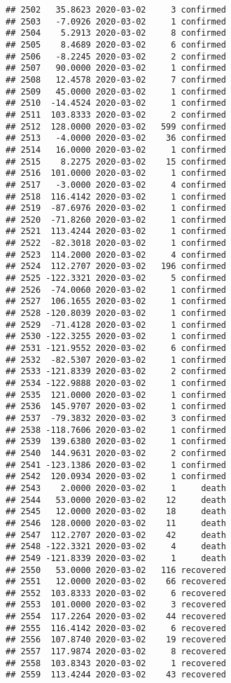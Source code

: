 \documentclass[
]{article}
\begin{document}
\begin{verbatim}
## 2502   35.8623 2020-03-02     3 confirmed
## 2503   -7.0926 2020-03-02     1 confirmed
## 2504    5.2913 2020-03-02     8 confirmed
## 2505    8.4689 2020-03-02     6 confirmed
## 2506   -8.2245 2020-03-02     2 confirmed
## 2507   90.0000 2020-03-02     1 confirmed
## 2508   12.4578 2020-03-02     7 confirmed
## 2509   45.0000 2020-03-02     1 confirmed
## 2510  -14.4524 2020-03-02     1 confirmed
## 2511  103.8333 2020-03-02     2 confirmed
## 2512  128.0000 2020-03-02   599 confirmed
## 2513   -4.0000 2020-03-02    36 confirmed
## 2514   16.0000 2020-03-02     1 confirmed
## 2515    8.2275 2020-03-02    15 confirmed
## 2516  101.0000 2020-03-02     1 confirmed
## 2517   -3.0000 2020-03-02     4 confirmed
## 2518  116.4142 2020-03-02     1 confirmed
## 2519  -87.6976 2020-03-02     1 confirmed
## 2520  -71.8260 2020-03-02     1 confirmed
## 2521  113.4244 2020-03-02     1 confirmed
## 2522  -82.3018 2020-03-02     1 confirmed
## 2523  114.2000 2020-03-02     4 confirmed
## 2524  112.2707 2020-03-02   196 confirmed
## 2525 -122.3321 2020-03-02     5 confirmed
## 2526  -74.0060 2020-03-02     1 confirmed
## 2527  106.1655 2020-03-02     1 confirmed
## 2528 -120.8039 2020-03-02     1 confirmed
## 2529  -71.4128 2020-03-02     1 confirmed
## 2530 -122.3255 2020-03-02     1 confirmed
## 2531 -121.9552 2020-03-02     6 confirmed
## 2532  -82.5307 2020-03-02     1 confirmed
## 2533 -121.8339 2020-03-02     2 confirmed
## 2534 -122.9888 2020-03-02     1 confirmed
## 2535  121.0000 2020-03-02     1 confirmed
## 2536  145.9707 2020-03-02     1 confirmed
## 2537  -79.3832 2020-03-02     3 confirmed
## 2538 -118.7606 2020-03-02     1 confirmed
## 2539  139.6380 2020-03-02     1 confirmed
## 2540  144.9631 2020-03-02     2 confirmed
## 2541 -123.1386 2020-03-02     1 confirmed
## 2542  120.0934 2020-03-02     1 confirmed
## 2543    2.0000 2020-03-02     1     death
## 2544   53.0000 2020-03-02    12     death
## 2545   12.0000 2020-03-02    18     death
## 2546  128.0000 2020-03-02    11     death
## 2547  112.2707 2020-03-02    42     death
## 2548 -122.3321 2020-03-02     4     death
## 2549 -121.8339 2020-03-02     1     death
## 2550   53.0000 2020-03-02   116 recovered
## 2551   12.0000 2020-03-02    66 recovered
## 2552  103.8333 2020-03-02     6 recovered
## 2553  101.0000 2020-03-02     3 recovered
## 2554  117.2264 2020-03-02    44 recovered
## 2555  116.4142 2020-03-02     6 recovered
## 2556  107.8740 2020-03-02    19 recovered
## 2557  117.9874 2020-03-02     8 recovered
## 2558  103.8343 2020-03-02     1 recovered
## 2559  113.4244 2020-03-02    43 recovered

\end{verbatim}
\end{document}
